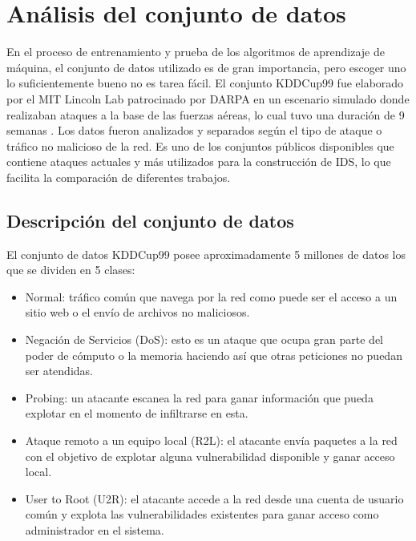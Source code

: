 \chapter{Análisis del conjunto de datos}\label{chapter:dataset}

En el proceso de entrenamiento y prueba de los algoritmos de aprendizaje de máquina, el conjunto de datos utilizado es de gran importancia, pero escoger uno lo suficientemente bueno no es tarea fácil. El conjunto KDDCup99 fue elaborado por el MIT Lincoln Lab patrocinado por DARPA en un escenario simulado donde realizaban ataques a la base de las fuerzas aéreas, lo cual tuvo una duración de 9 semanas \cite{mchugh2000testing}. Los datos fueron analizados y separados según el tipo de ataque o tráfico no malicioso de la red. Es uno de los conjuntos públicos disponibles que contiene ataques actuales y más utilizados para la construcción de IDS, lo que facilita la comparación de diferentes trabajos.

\section{Descripción del conjunto de datos}\label{section:dataset_description}
El conjunto de datos KDDCup99 posee aproximadamente 5 millones de datos los que se dividen en 5 clases:

\begin{itemize}
    \item Normal: tráfico común que navega por la red como puede ser el acceso a un sitio web o el envío de archivos no maliciosos.
    \item Negación de Servicios (DoS): esto es un ataque que ocupa gran parte del poder de cómputo o la memoria haciendo así que otras peticiones no puedan ser atendidas.
    \item Probing: un atacante escanea la red para ganar información que pueda explotar en el momento de infiltrarse en esta.
    \item Ataque remoto a un equipo local (R2L): el atacante envía paquetes a la red con el objetivo de explotar alguna vulnerabilidad disponible y ganar acceso local.
    \item User to Root (U2R): el atacante accede a la red desde una cuenta de usuario común y explota las vulnerabilidades existentes para ganar acceso como administrador en el sistema.
\end{itemize}

